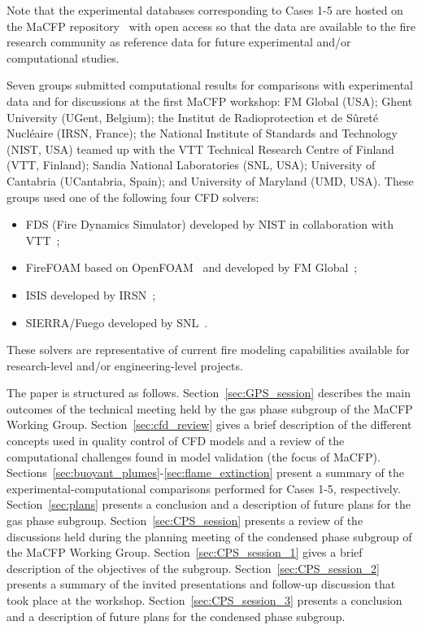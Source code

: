 Note that the experimental databases corresponding to Cases 1-5 are hosted on the MaCFP repository~\cite{MaCFP_repository} with open access so that the data are available to the fire research community as reference data for future experimental and/or computational studies.

Seven groups submitted computational results for comparisons with experimental data and for discussions at the first MaCFP workshop: FM Global (USA); Ghent University (UGent, Belgium); the Institut de Radioprotection et de S\^uret\'e Nucl\'eaire (IRSN, France); the National Institute of Standards and Technology (NIST, USA) teamed up with the VTT Technical Research Centre of Finland (VTT, Finland); Sandia National Laboratories (SNL, USA); University of Cantabria (UCantabria, Spain); and University of Maryland (UMD, USA). These groups used one of the following four CFD solvers:

\begin{itemize}
\item FDS (Fire Dynamics Simulator) developed by NIST in collaboration with VTT~\cite{FDS};
\item FireFOAM based on OpenFOAM~\cite{OpenFOAM} and developed by FM Global~\cite{FireFOAM};
\item ISIS developed by IRSN~\cite{ISIS};
\item SIERRA/Fuego developed by SNL~\cite{SIERRA/Fuego}.
\end{itemize}

These solvers are representative of current fire modeling capabilities available for research-level and/or engineering-level projects.

The paper is structured as follows. Section~\ref{sec:GPS_session} describes the main outcomes of the technical meeting held by the gas phase subgroup of the MaCFP Working Group. Section~\ref{sec:cfd_review} gives a brief description of the different concepts used in quality control of CFD models and a review of the computational challenges found in model validation (the focus of MaCFP). Sections~\ref{sec:buoyant_plumes}-\ref{sec:flame_extinction} present a summary of the experimental-computational comparisons performed for Cases 1-5, respectively. Section~\ref{sec:plans} presents a conclusion and a description of future plans for the gas phase subgroup. Section~\ref{sec:CPS_session} presents a review of the discussions held during the planning meeting of the condensed phase subgroup of the MaCFP Working Group. Section~\ref{sec:CPS_session_1} gives a brief description of the objectives of the subgroup. Section~\ref{sec:CPS_session_2} presents a summary of the invited presentations and follow-up discussion that took place at the workshop. Section~\ref{sec:CPS_session_3} presents a conclusion and a description of future plans for the condensed phase subgroup.





